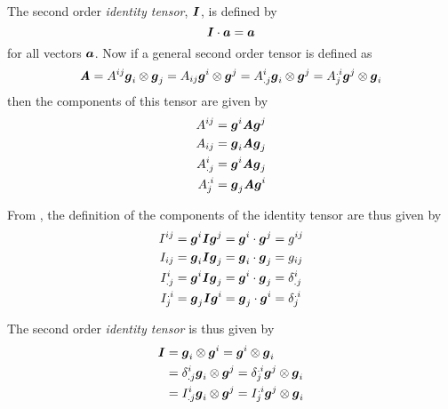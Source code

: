 The second order \emph{identity tensor}, $  \boldsymbol{\mathit{ I }}  $, is defined by
\begin{equation}
  \dotprod{\identitytensortwo}{\vectr{a}}=\vectr{a}
  \label{eqn:DefinitionIdentitySecondOrder}
\end{equation}
for all vectors $\boldsymbol{a}$. Now if a general second order tensor is defined
as
\begin{equation}
  \boldsymbol{\mathit{A}}=A^{ij} \boldsymbol{g}_{i} \otimes \boldsymbol{g}_{j} =A_{ij} \boldsymbol{g}^{i} \otimes \boldsymbol{g}^{j} =A^{i}_{.j} \boldsymbol{g}_{i} \otimes \boldsymbol{g}^{j} =A^{.i}_{j} \boldsymbol{g}^{j} \otimes \boldsymbol{g}_{i} 
\end{equation}
then the components of this tensor are given by
\begin{equation}
  \begin{aligned}
    A^{ij}&=\boldsymbol{g}^{i}\boldsymbol{\mathit{A}}\boldsymbol{g}^{j} \\
    A_{ij}&=\boldsymbol{g}_{i}\boldsymbol{\mathit{A}}\boldsymbol{g}_{j} \\
    A^{i}_{.j}&=\boldsymbol{g}^{i}\boldsymbol{\mathit{A}}\boldsymbol{g}_{j} \\
    A^{.i}_{j}&=\boldsymbol{g}_{j}\boldsymbol{\mathit{A}}\boldsymbol{g}^{i}    
  \end{aligned}
\end{equation}

From , the definition of the components of the identity tensor are thus given by
\begin{equation}
  \begin{aligned}
    I^{ij}&=\boldsymbol{g}^{i}\boldsymbol{\mathit{I}}\boldsymbol{g}^{j}= \boldsymbol{g}^{i}  \cdot  \boldsymbol{g}^{j} =g^{ij} \\
    I_{ij}&=\boldsymbol{g}_{i}\boldsymbol{\mathit{I}}\boldsymbol{g}_{j}= \boldsymbol{g}_{i}  \cdot  \boldsymbol{g}_{j} =g_{ij}  \\
    I^{i}_{.j}&=\boldsymbol{g}^{i}\boldsymbol{\mathit{I}}\boldsymbol{g}_{j}= \boldsymbol{g}^{i}  \cdot  \boldsymbol{g}_{j} = \delta^{i}_{.j}  \\
    I^{.i}_{j}&=\boldsymbol{g}_{j}\boldsymbol{\mathit{I}}\boldsymbol{g}^{i}= \boldsymbol{g}_{j}  \cdot  \boldsymbol{g}^{i} = \delta^{.i}_{j}     
  \end{aligned}
\end{equation}

The second order \emph{identity tensor} is thus given by
\begin{equation}
  \begin{aligned}
      \boldsymbol{\mathit{ I }}  &= \boldsymbol{g}_{i} \otimes \boldsymbol{g}^{i} = \boldsymbol{g}^{i} \otimes \boldsymbol{g}_{i} \\
    &= \delta^{i}_{.j}  \boldsymbol{g}_{i} \otimes \boldsymbol{g}^{j} = \delta^{.i}_{j}  \boldsymbol{g}^{j} \otimes \boldsymbol{g}_{i} \\
    &=I^{i}_{.j} \boldsymbol{g}_{i} \otimes \boldsymbol{g}^{j} =I^{.i}_{j} \boldsymbol{g}^{j} \otimes \boldsymbol{g}_{i} 
  \end{aligned}
\end{equation}

